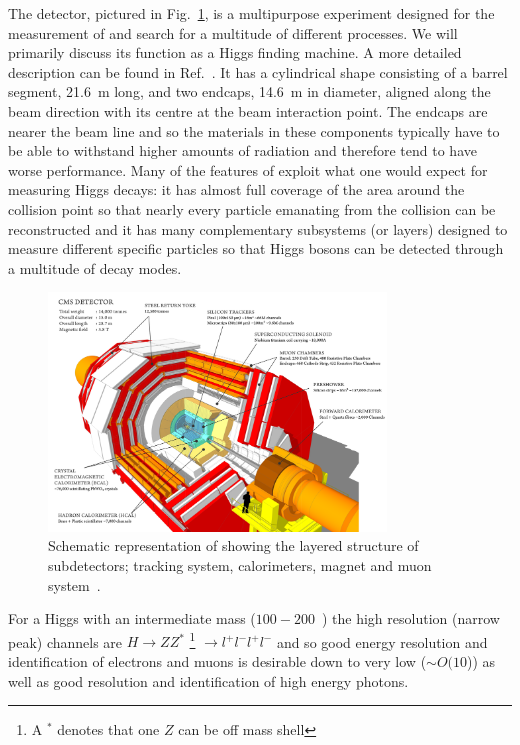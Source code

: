 The \CMS detector, pictured in Fig.~\ref{fig:cms_diagram}, is a multipurpose experiment designed for the measurement of and search for a multitude of different processes. We will primarily discuss its function as a Higgs finding machine. A more detailed description can be found in Ref.~\cite{CMS_JINST}. It has a cylindrical shape consisting of a barrel segment, 21.6~m long, and two endcaps, 14.6~m in diameter, aligned along the beam direction with its centre at the beam interaction point. The endcaps are nearer the beam line and so the materials in these components typically have to be able to withstand higher amounts of radiation and therefore tend to have worse performance. Many of the features of \CMS exploit what one would expect for measuring Higgs decays: it has almost full coverage of the area around the collision point so that nearly every particle emanating from the collision can be reconstructed and it has many complementary subsystems (or layers) designed to measure different specific particles so that Higgs bosons can be detected through a multitude of decay modes. 

\begin{figure}
  \includegraphics[width=0.8\textwidth]{cms_experiment/plots/cms_diagram.png}
  \caption[\acs{CMS} diagram]{Schematic representation of \CMS showing the layered structure of subdetectors; tracking system, calorimeters, magnet and muon system~\cite{cms_schematic}.}
  \label{fig:cms_diagram}
\end{figure}


For a Higgs with an intermediate mass ($100 - 200$~\GeV) the high resolution (narrow peak) channels are $H\rightarrow ZZ^{*}$ \footnote{A $^{*}$ denotes that one $Z$ can be off mass shell} $\rightarrow l^{+}l^{-}l^{+}l^{-}$ and \Hgg so good energy resolution and identification of electrons and muons is desirable down to very low \pT ($\sim O(10$\GeV)) as well as good resolution and identification of high energy photons. 

